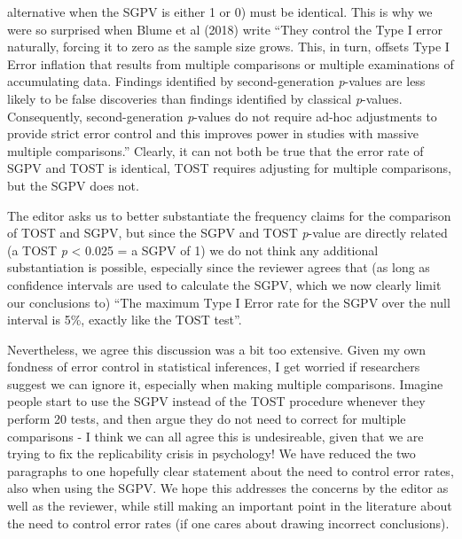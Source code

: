 \documentclass[man]{apa6}
\begin{document}
\begin{enumerate}
  alternative when the SGPV is either 1 or 0) must be identical. This is
  why we were so surprised when Blume et al (2018) write \enquote{They
  control the Type I error naturally, forcing it to zero as the sample
  size grows. This, in turn, offsets Type I Error inflation that results
  from multiple comparisons or multiple examinations of accumulating
  data. Findings identified by second-generation \emph{p}-values are
  less likely to be false discoveries than findings identified by
  classical \emph{p}-values. Consequently, second-generation
  \emph{p}-values do not require ad-hoc adjustments to provide strict
  error control and this improves power in studies with massive multiple
  comparisons.} Clearly, it can not both be true that the error rate of
  SGPV and TOST is identical, TOST requires adjusting for multiple
  comparisons, but the SGPV does not.
\end{enumerate}

The editor asks us to better substantiate the frequency claims for the
comparison of TOST and SGPV, but since the SGPV and TOST \emph{p}-value
are directly related (a TOST \emph{p} \textless{} 0.025 = a SGPV of 1)
we do not think any additional substantiation is possible, especially
since the reviewer agrees that (as long as confidence intervals are used
to calculate the SGPV, which we now clearly limit our conclusions to)
\enquote{The maximum Type I Error rate for the SGPV over the null
interval is 5\%, exactly like the TOST test}.

Nevertheless, we agree this discussion was a bit too extensive. Given my
own fondness of error control in statistical inferences, I get worried
if researchers suggest we can ignore it, especially when making multiple
comparisons. Imagine people start to use the SGPV instead of the TOST
procedure whenever they perform 20 tests, and then argue they do not
need to correct for multiple comparisons - I think we can all agree this
is undesireable, given that we are trying to fix the replicability
crisis in psychology! We have reduced the two paragraphs to one
hopefully clear statement about the need to control error rates, also
when using the SGPV. We hope this addresses the concerns by the editor
as well as the reviewer, while still making an important point in the
literature about the need to control error rates (if one cares about
drawing incorrect conclusions).
\end{document}
